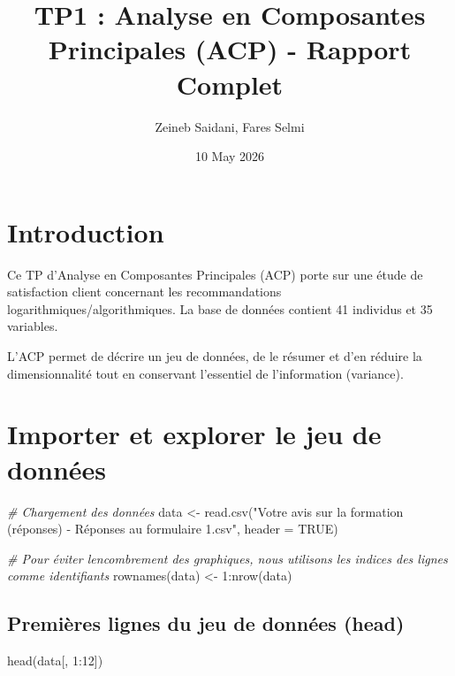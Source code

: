 \documentclass[
]{article}
\title{TP1 : Analyse en Composantes Principales (ACP) - Rapport Complet}
\author{Zeineb Saidani, Fares Selmi}
\date{10 May 2026}
\newenvironment{Shaded}{\begin{snugshade}}{\end{snugshade}}
\newcommand{\AttributeTok}[1]{\textcolor[rgb]{0.77,0.63,0.00}{#1}}
\newcommand{\CommentTok}[1]{\textcolor[rgb]{0.56,0.35,0.01}{\textit{#1}}}
\newcommand{\ConstantTok}[1]{\textcolor[rgb]{0.00,0.00,0.00}{#1}}
\newcommand{\DecValTok}[1]{\textcolor[rgb]{0.00,0.00,0.81}{#1}}
\newcommand{\FunctionTok}[1]{\textcolor[rgb]{0.00,0.00,0.00}{#1}}
\newcommand{\NormalTok}[1]{#1}
\newcommand{\OtherTok}[1]{\textcolor[rgb]{0.56,0.35,0.01}{#1}}
\newcommand{\SpecialCharTok}[1]{\textcolor[rgb]{0.00,0.00,0.00}{#1}}
\newcommand{\StringTok}[1]{\textcolor[rgb]{0.31,0.60,0.02}{#1}}
\begin{document}
\maketitle

{
\setcounter{tocdepth}{3}
\tableofcontents
}
\hypertarget{introduction}{%
\section{Introduction}\label{introduction}}

Ce TP d'Analyse en Composantes Principales (ACP) porte sur une étude de
satisfaction client concernant les recommandations
logarithmiques/algorithmiques. La base de données contient 41 individus
et 35 variables.

L'ACP permet de décrire un jeu de données, de le résumer et d'en réduire
la dimensionnalité tout en conservant l'essentiel de l'information
(variance).

\hypertarget{importer-et-explorer-le-jeu-de-donnuxe9es}{%
\section{Importer et explorer le jeu de
données}\label{importer-et-explorer-le-jeu-de-donnuxe9es}}

\begin{Shaded}
\begin{Highlighting}[]
\CommentTok{\# Chargement des données}
\NormalTok{data }\OtherTok{\textless{}{-}} \FunctionTok{read.csv}\NormalTok{(}\StringTok{"Votre avis sur la formation (réponses) {-} Réponses au formulaire 1.csv"}\NormalTok{, }\AttributeTok{header =} \ConstantTok{TRUE}\NormalTok{)}

\CommentTok{\# Pour éviter l\textquotesingle{}encombrement des graphiques, nous utilisons les indices des lignes comme identifiants}
\FunctionTok{rownames}\NormalTok{(data) }\OtherTok{\textless{}{-}} \DecValTok{1}\SpecialCharTok{:}\FunctionTok{nrow}\NormalTok{(data)}
\end{Highlighting}
\end{Shaded}

\hypertarget{premiuxe8res-lignes-du-jeu-de-donnuxe9es-head}{%
\subsection{Premières lignes du jeu de données
(head)}\label{premiuxe8res-lignes-du-jeu-de-donnuxe9es-head}}

\begin{Shaded}
\begin{Highlighting}[]
\FunctionTok{head}\NormalTok{(data[, }\DecValTok{1}\SpecialCharTok{:}\DecValTok{12}\NormalTok{])}
\end{Highlighting}
\end{Shaded}
\end{document}
